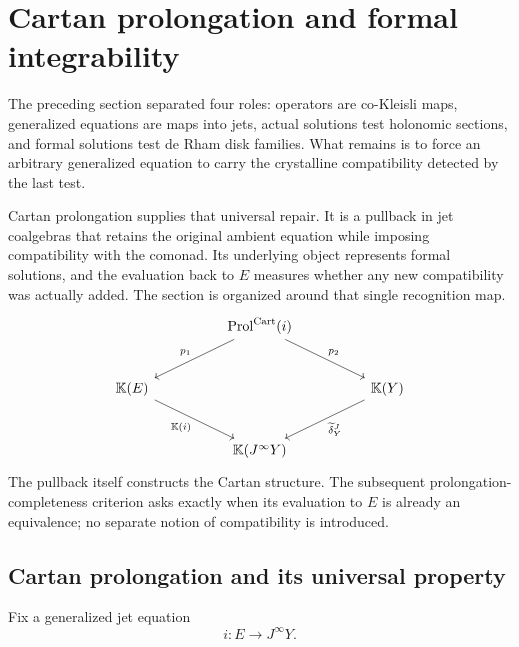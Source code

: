 \section{Cartan prolongation and formal integrability}
\label{sec:jets-cartan-formal-integrability}

The preceding section separated four roles: operators are co-Kleisli maps,
generalized equations are maps into jets, actual solutions test holonomic
sections, and formal solutions test de Rham disk families. What remains is to
force an arbitrary generalized equation to carry the crystalline compatibility
detected by the last test.

Cartan prolongation supplies that universal repair. It is a pullback in jet
coalgebras that retains the original ambient equation while imposing
compatibility with the comonad. Its underlying object represents formal
solutions, and the evaluation back to \(E\) measures whether any new
compatibility was actually added. The section is organized around that single
recognition map.
\[
\begin{tikzcd}[column sep=huge,row sep=large]
&
\operatorname{Prol}^{\mathrm{Cart}}(i)
  \ar[dl,"p_1"']
  \ar[dr,"p_2"]
&
\\
\mathbb K(E)
  \ar[dr,"\mathbb K(i)"']
&&
\mathbb K(Y)
  \ar[dl,"\widetilde\delta^J_Y"]
\\
&
\mathbb K(J^\infty Y)
&
\end{tikzcd}
\]
The pullback itself constructs the Cartan structure. The subsequent
prolongation-completeness criterion asks exactly when its evaluation to \(E\)
is already an equivalence; no separate notion of compatibility is introduced.
\subsection{Cartan prolongation and its universal property}
\label{sec:cartan-prolongation}

Fix a generalized jet equation
\[
  i:E\longrightarrow J^\infty Y.
\]

